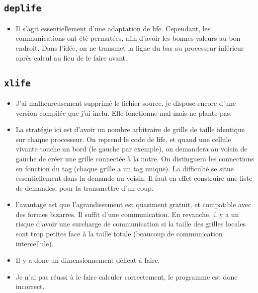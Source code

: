 \documentclass{article}
\begin{document}
\subsection*{\texttt{deplife}}
\begin{itemize}
	\item Il s'agit essentiellement d'une adaptation de life. Cependant, les communications ont été permutées, afin d'avoir les bonnes valeurs au bon endroit. Dans l'idée, on ne transmet la ligne du bas au processeur inférieur après calcul au lieu de le faire avant.
\end{itemize}
		
\subsection*{\texttt{xlife}}
\begin{itemize}
  \item J'ai malheureusement supprimé le fichier source, je dispose encore d'une version compilée que j'ai inclu. Elle fonctionne mal mais ne plante pas.
	\item La stratégie ici est d'avoir un nombre arbitraire de grille de taille identique sur chaque processeur. On reprend le code de life, et quand une cellule vivante touche un bord (le gauche par exemple), on demandera au voisin de gauche de créer une grille connectée à la notre. On distinguera les connections en fonction du tag (chaque grille a un tag unique). La difficulté se situe essentiellement dans la demande au voisin. Il faut en effet construire une liste de demandes, pour la transmettre d'un coup.
  \item l'avantage est que l'agrandissement est quasiment gratuit, et compatible avec des formes bizarres. Il suffit d'une communication. En revanche, il y a un risque d'avoir une surcharge de communication si la taille des grilles locales sont trop petites face à la taille totale (beaucoup de communication intercellule).
  \item Il y a donc un dimensionnement délicat à faire.
  \item Je n'ai pas réussi à le faire calculer correctement, le programme est donc incorrect.
\end{itemize}
\end{document}
